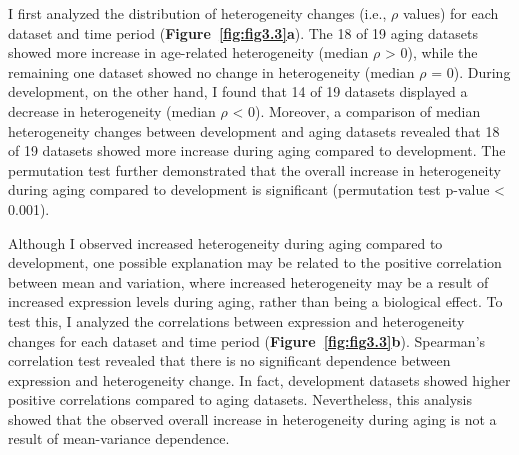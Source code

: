 
I first analyzed the distribution of heterogeneity changes (i.e., $\rho$ values) for each dataset and time period (\textbf{Figure~\ref{fig:fig3.3}a}).
The 18 of 19 aging datasets showed more increase in age-related heterogeneity (median $\rho$ > 0), 
while the remaining one dataset showed no change in heterogeneity (median $\rho$ = 0). 
During development, on the other hand, I found that 14 of 19 datasets displayed a decrease in heterogeneity  (median $\rho$ < 0).
Moreover, a comparison of median heterogeneity changes between development and aging datasets revealed that 
18 of 19 datasets showed more increase during aging compared to development. 
The permutation test further demonstrated that the overall increase in heterogeneity during aging compared to development is significant (permutation test p-value < 0.001).

Although I observed increased heterogeneity during aging compared to development, 
one possible explanation may be related to the positive correlation between mean and variation, 
where increased heterogeneity may be a result of increased expression levels during aging, rather than being a biological effect.
To test this, I analyzed the correlations between expression and heterogeneity changes for each dataset and time period (\textbf{Figure~\ref{fig:fig3.3}b}).
Spearman's correlation test revealed that there is no significant dependence between expression and heterogeneity change.
In fact, development datasets showed higher positive correlations compared to aging datasets. 
Nevertheless, this analysis showed that the observed overall increase in heterogeneity during aging is not a result of mean-variance dependence.

